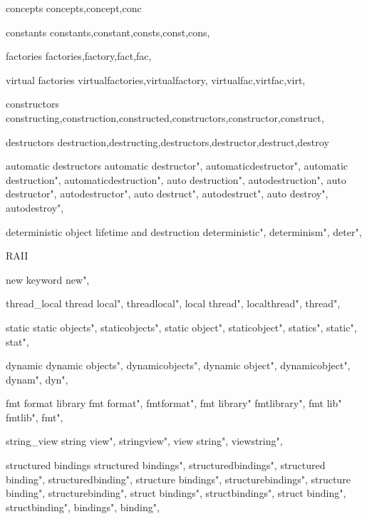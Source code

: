         concepts 
        concepts,concept,conc
        
         constants 
        constants,constant,consts,const,cons,
        
         factories 
        factories,factory,fact,fac,
        
         virtual factories 
        virtualfactories,virtualfactory,  
        virtualfac,virtfac,virt,
        
         constructors 
        constructing,construction,constructed,constructors,constructor,construct,
        
         destructors
        destruction,destructing,destructors,destructor,destruct,destroy
        
         automatic destructors 
        automatic destructor",  
        automaticdestructor",  
        automatic destruction", 
        automaticdestruction", 
        auto destruction",  
        autodestruction",  
        auto destructor",  
        autodestructor",  
        auto destruct",  
        autodestruct",  
        auto destroy",  
        autodestroy",  
        
         deterministic object lifetime and destruction
        deterministic",  
        determinism",  
        deter",  
        
         RAII 
        
         new keyword 
        new",
        
         thread_local
        thread local",
        threadlocal",
        local thread",
        localthread",
        thread",
        
         static 
        static objects",
        staticobjects",
        static object",
        staticobject",
        statics",
        static",
        stat", 
        
         dynamic 
        dynamic objects",
        dynamicobjects",
        dynamic object",
        dynamicobject",
        dynam",
        dyn",
        
         fmt format library
        fmt format",
        fmtformat",
        fmt library"
        fmtlibrary",
        fmt lib"
        fmtlib",
        fmt",
          
         string_view
        string view",
        stringview",
        view string",
        viewstring",
        
         structured bindings
        structured bindings",
        structuredbindings",
        structured binding",
        structuredbinding", 
        structure bindings",
        structurebindings", 
        structure binding", 
        structurebinding",
        struct bindings",
        structbindings",
        struct binding",
        structbinding",
        bindings",
        binding",
        
